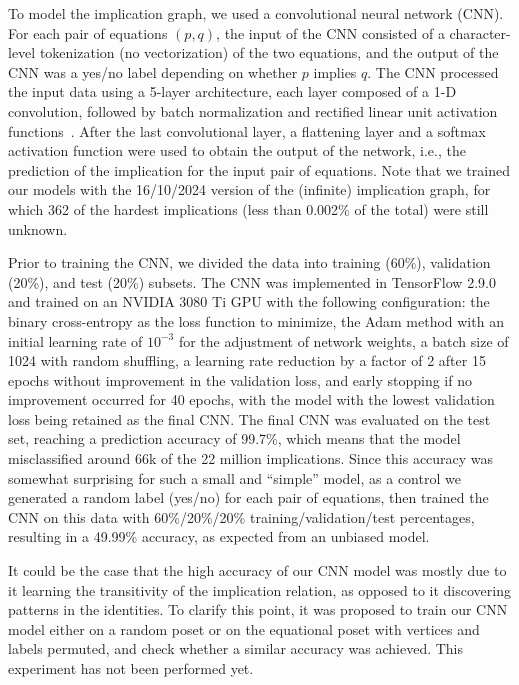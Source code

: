 To model the implication graph, we used a convolutional neural network (CNN)\@. For each pair of equations $(p,q)$, the input of the CNN consisted of a character-level tokenization (no vectorization) of the two equations, and the output of the CNN was a yes/no label depending on whether $p$ implies $q$. The CNN processed the input data using a 5-layer architecture, each layer composed of a 1-D convolution, followed by batch normalization and rectified linear unit activation functions~\cite{Goodfellow-et-al-2016}. After the last convolutional layer, a flattening layer and a softmax activation function were used to obtain the output of the network, i.e.\@, the prediction of the implication for the input pair of equations. Note that we trained our models with the 16/10/2024 version of the (infinite) implication graph, for which 362 of the hardest implications (less than 0.002\% of the total) were still unknown.

\smallskip

Prior to training the CNN, we divided the data into training (60\%), validation (20\%), and test (20\%) subsets. The CNN was implemented in TensorFlow 2.9.0~\cite{tensorflow2015-whitepaper} and trained on an NVIDIA 3080 Ti GPU with the following configuration: the binary cross-entropy as the loss function to minimize, the Adam method with an initial learning rate of $10^{-3}$ for the adjustment of network weights, a batch size of 1024 with random shuffling, a learning rate reduction by a factor of 2 after 15 epochs without improvement in the validation loss, and early stopping if no improvement occurred for 40 epochs, with the model with the lowest validation loss being retained as the final CNN\@.
The final CNN was evaluated on the test set, reaching a prediction accuracy of 99.7\%, which means that the model misclassified around 66k of the 22 million implications. Since this accuracy was somewhat surprising for such a small and “simple” model, as a control we generated a random label (yes/no) for each pair of equations, then trained the CNN on this data with 60\%/20\%/20\% training/validation/test percentages, resulting in a 49.99\% accuracy, as expected from an unbiased model.

\smallskip

It could be the case that the high accuracy of our CNN model was mostly due to it learning the transitivity of the implication relation, as opposed to it discovering patterns in the identities. To clarify this point, it was proposed to train our CNN model either on a random poset or on the equational poset with vertices and labels permuted, and check whether a similar accuracy was achieved. This experiment has not been performed yet.

